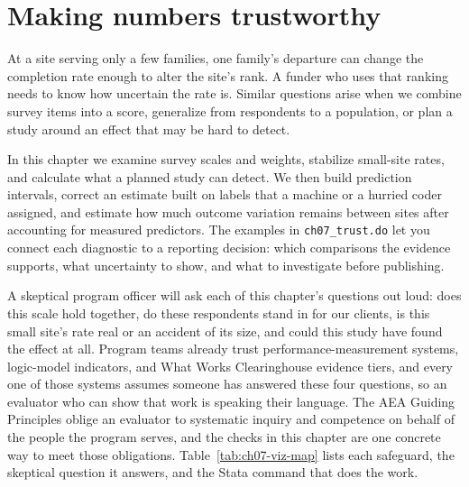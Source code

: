 \chapter{Making numbers trustworthy}\label{ch:trust}

At a site serving only a few families, one family's departure can change the completion rate enough to alter the site's rank. A funder who uses that ranking needs to know how uncertain the rate is. Similar questions arise when we combine survey items into a score, generalize from respondents to a population, or plan a study around an effect that may be hard to detect.

In this chapter we examine survey scales and weights, stabilize small-site rates, and calculate what a planned study can detect. We then build prediction intervals, correct an estimate built on labels that a machine or a hurried coder assigned, and estimate how much outcome variation remains between sites after accounting for measured predictors. The examples in \texttt{ch07\_trust.do} let you connect each diagnostic to a reporting decision: which comparisons the evidence supports, what uncertainty to show, and what to investigate before publishing.

A skeptical program officer will ask each of this chapter's questions out loud: does this scale hold together, do these respondents stand in for our clients, is this small site's rate real or an accident of its size, and could this study have found the effect at all. Program teams already trust performance-measurement systems, logic-model indicators, and What Works Clearinghouse evidence tiers, and every one of those systems assumes someone has answered these four questions, so an evaluator who can show that work is speaking their language. The AEA Guiding Principles oblige an evaluator to systematic inquiry and competence on behalf of the people the program serves, and the checks in this chapter are one concrete way to meet those obligations. Table~\ref{tab:ch07-viz-map} lists each safeguard, the skeptical question it answers, and the Stata command that does the work.

